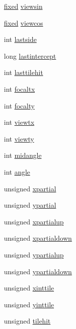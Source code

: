 \begin{DoxyCompactItemize}
\item 
\hyperlink{WL__DEF_8H_aaf54715c9b83afe8794059fcf5fd5e7e}{fixed} \hyperlink{WL__DRAW_8C_a6ca4a83bcb83e06a95d69a43ab77887e}{viewsin}
\item 
\hyperlink{WL__DEF_8H_aaf54715c9b83afe8794059fcf5fd5e7e}{fixed} \hyperlink{WL__DRAW_8C_a0e86106be09185a6081d7d46b004a303}{viewcos}
\item 
int \hyperlink{WL__DRAW_8C_adbb86c0c34819885f5e56627739b98b5}{lastside}
\item 
long \hyperlink{WL__DRAW_8C_a83391f65f496c95c12692707841ba574}{lastintercept}
\item 
int \hyperlink{WL__DRAW_8C_a7d559f61f38039e10619fc75e6f17b86}{lasttilehit}
\item 
int \hyperlink{WL__DRAW_8C_a2b4041cde019ba3febac8334f74e42c4}{focaltx}
\item 
int \hyperlink{WL__DRAW_8C_a19dcc98bf8468145ab2f2fe8ca8850e3}{focalty}
\item 
int \hyperlink{WL__DRAW_8C_acd11d06f91d468faeaa55b8fa92c1379}{viewtx}
\item 
int \hyperlink{WL__DRAW_8C_a636488a30559d17e96fbb321aa3345f2}{viewty}
\item 
int \hyperlink{WL__DRAW_8C_a1f72956f3ded1f81dbc45ace5bb995d0}{midangle}
\item 
int \hyperlink{WL__DRAW_8C_a63177970cacb40efba67ce501ea89210}{angle}
\item 
unsigned \hyperlink{WL__DRAW_8C_a9aa568531dfc4093a2376361ff2a9e16}{xpartial}
\item 
unsigned \hyperlink{WL__DRAW_8C_a621918120fb37f5d39a77e094482ec45}{ypartial}
\item 
unsigned \hyperlink{WL__DRAW_8C_a03a974ad865a0b0b68cbf40e3d487398}{xpartialup}
\item 
unsigned \hyperlink{WL__DRAW_8C_a0839493434a145926108fd09e170e0e4}{xpartialdown}
\item 
unsigned \hyperlink{WL__DRAW_8C_aae5a51d88e6e719d8ada31460ff34e21}{ypartialup}
\item 
unsigned \hyperlink{WL__DRAW_8C_ac287c61adc8bb9528987e8acaf934217}{ypartialdown}
\item 
unsigned \hyperlink{WL__DRAW_8C_ae631b3bba2537eacaf1f3081102c3322}{xinttile}
\item 
unsigned \hyperlink{WL__DRAW_8C_a03577e75c21dbb95fb58840649786b5f}{yinttile}
\item 
unsigned \hyperlink{WL__DRAW_8C_a78da4a34948ae93be71fddfc652c5690}{tilehit}
\item 

\end{DoxyCompactItemize}
